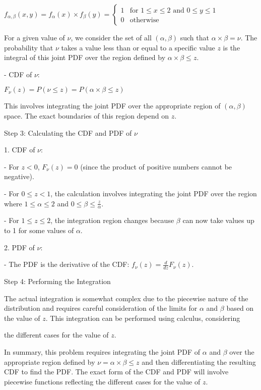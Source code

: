 \( f_{\alpha,\beta}(x, y) = f_{\alpha}(x) \times f_{\beta}(y) = \begin{cases}
    1 & \text{for } 1 \leq x \leq 2 \text{ and } 0 \leq y \leq 1 \\
    0 & \text{otherwise}
\end{cases} \)

For a given value of \(\nu\), we consider the set of all \((\alpha, \beta)\) such that \(\alpha \times \beta = \nu\). The probability that \(\nu\) takes a value less than or equal to a specific value \(z\) is the integral of this joint PDF over the region defined by \(\alpha \times \beta \leq z\).

- CDF of \(\nu\):

\( F_{\nu}(z) = P(\nu \leq z) = P(\alpha \times \beta \leq z) \)

This involves integrating the joint PDF over the appropriate region of \((\alpha, \beta)\) space. The exact boundaries of this region depend on \(z\).

Step 3: Calculating the CDF and PDF of \(\nu\)

1. CDF of \(\nu\):

- For \(z < 0\), \(F_{\nu}(z) = 0\) (since the product of positive numbers cannot be negative).

- For \(0 \leq z < 1\), the calculation involves integrating the joint PDF over the region where \(1 \leq \alpha \leq 2\) and \(0 \leq \beta \leq \frac{z}{\alpha}\).

- For \(1 \leq z \leq 2\), the integration region changes because \(\beta\) can now take values up to 1 for some values of \(\alpha\).

2. PDF of \(\nu\):

- The PDF is the derivative of the CDF: \(f_{\nu}(z) = \frac{d}{dz}F_{\nu}(z)\).

Step 4: Performing the Integration

The actual integration is somewhat complex due to the piecewise nature of the distribution and requires careful consideration of the limits for \(\alpha\) and \(\beta\) based on the value of \(z\). This integration can be performed using calculus, considering

the different cases for the value of \(z\).

In summary, this problem requires integrating the joint PDF of \(\alpha\) and \(\beta\) over the appropriate region defined by \(\nu = \alpha \times \beta \leq z\) and then differentiating the resulting CDF to find the PDF. The exact form of the CDF and PDF will involve piecewise functions reflecting the different cases for the value of \(z\).